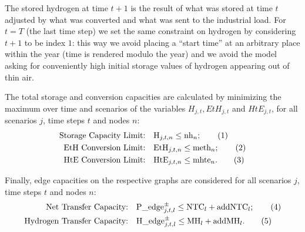 \documentclass[smallextended,natbib]{svjour3}       %
\numberwithin{theorem}{section}
\begin{document}
The stored hydrogen at time $t+1$ is the result of what was stored at time $t$ adjusted by what was converted and what was sent to the industrial load. 
For $t=T$ (the last time step) we set the same constraint on hydrogen by considering $t+1$ to be index $1$: this way we avoid placing a ``start time'' at an arbitrary place within the year (time is rendered modulo the year) and we avoid the model asking for conveniently high initial storage values of hydrogen appearing out of thin air.

The total storage and conversion capacities are calculated by minimizing the maximum over time and scenarios of the variables $H_{j,t}, EtH_{j,t}$ and $HtE_{j,t}$, for all scenarios \(j\), time steps \(t\) and nodes \(n\):
\begin{align*}
    \text{Storage Capacity Limit:} \quad & \text{H}_{j,t,n} \leq \text{nh}_n ;\stepcounter{equation}\tag{\theequation}\label{constr_nh}\\
    \text{EtH Conversion Limit:} \quad & \text{EtH}_{j,t,n} \leq \text{meth}_n; \stepcounter{equation}\tag{\theequation}\label{constr_meth}\\
    \text{HtE Conversion Limit:} \quad & \text{HtE}_{j,t,n} \leq \text{mhte}_n .\stepcounter{equation}\tag{\theequation}\label{constr_mhte}
\end{align*}

Finally, edge capacities on the respective graphs are considered for all scenarios \(j\), time steps \(t\) and nodes \(n\):
\begin{align*}
    \text{Net Transfer Capacity:} \quad & \text{P\_edge}^\pm_{j,t,l}\le\text{NTC}_l + \text{addNTC}_l ;\stepcounter{equation}\tag{\theequation}\label{constr_NTC}\\
    \text{Hydrogen Transfer Capacity:} \quad & \text{H\_edge}^\pm_{j,t,l}\le\text{MH}_l + \text{addMH}_l.\stepcounter{equation}\tag{\theequation}\label{constr_MH}
\end{align*}













\end{document}
